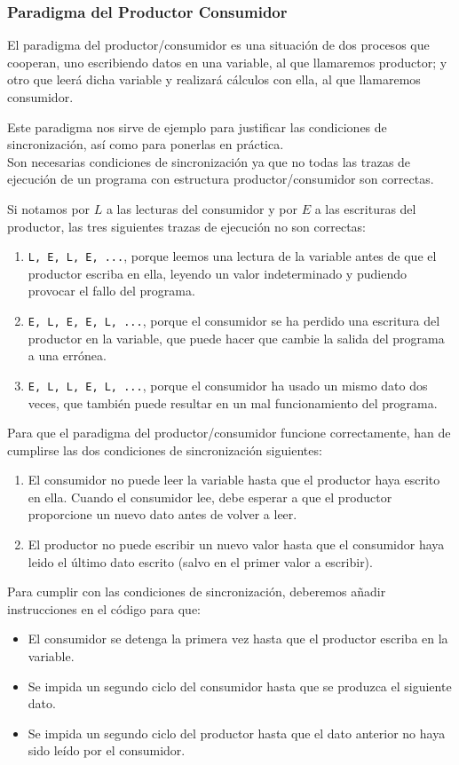 \subsubsection{Paradigma del Productor Consumidor}
El paradigma del productor/consumidor es una situación de dos procesos que cooperan, uno escribiendo datos en una variable, al que llamaremos productor; y otro que leerá dicha variable y realizará cálculos con ella, al que llamaremos consumidor.

Este paradigma nos sirve de ejemplo para justificar las condiciones de sincronización, así como para ponerlas en práctica.\\

Son necesarias condiciones de sincronización ya que no todas las trazas de ejecución de un programa con estructura productor/consumidor son correctas.

\begin{ejemplo}
    Si notamos por $L$ a las lecturas del consumidor y por $E$ a las escrituras del productor, las tres siguientes trazas de ejecución no son correctas:
    \begin{enumerate}
        \item \verb|L, E, L, E, ...|, porque leemos una lectura de la variable antes de que el productor escriba en ella, leyendo un valor indeterminado y pudiendo provocar el fallo del programa.
        \item \verb|E, L, E, E, L, ...|, porque el consumidor se ha perdido una escritura del productor en la variable, que puede hacer que cambie la salida del programa a una errónea.
        \item \verb|E, L, L, E, L, ...|, porque el consumidor ha usado un mismo dato dos veces, que también puede resultar en un mal funcionamiento del programa.
    \end{enumerate}
\end{ejemplo}

Para que el paradigma del productor/consumidor funcione correctamente, han de cumplirse las dos condiciones de sincronización siguientes:
\begin{enumerate}
    \item El consumidor no puede leer la variable hasta que el productor haya escrito en ella. Cuando el consumidor lee, debe esperar a que el productor proporcione un nuevo dato antes de volver a leer.
    \item El productor no puede escribir un nuevo valor hasta que el consumidor haya leido el último dato escrito (salvo en el primer valor a escribir).
\end{enumerate}
Para cumplir con las condiciones de sincronización, deberemos añadir instrucciones en el código para que:
\begin{itemize}
    \item El consumidor se detenga la primera vez hasta que el productor escriba en la variable.
    \item Se impida un segundo ciclo del consumidor hasta que se produzca el siguiente dato.
    \item Se impida un segundo ciclo del productor hasta que el dato anterior no haya sido leído por el consumidor.
\end{itemize}

